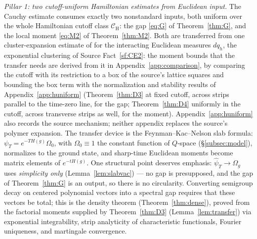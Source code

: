 \documentclass[11pt,a4paper]{article}
\theoremstyle{plain}
\theoremstyle{definition}
\theoremstyle{plain}
\theoremstyle{definition}
\newcommand{\CH}{\mathcal{C}_{\mathrm H}}
\newcommand{\Om}{\Omega}
\begin{document}
\emph{Pillar 1: two cutoff-uniform Hamiltonian estimates from Euclidean input.} The
Cauchy estimate consumes exactly two nonstandard inputs, both uniform over the whole
Hamiltonian cutoff class $\CH$: the gap \eqref{eq:G} of Theorem~\ref{thm:G}, and the
local moment \eqref{eq:M2} of Theorem~\ref{thm:M2}. Both are transferred from one
cluster-expansion estimate of \cite{GJS} for the interacting Euclidean measures
$dq_h$, the exponential clustering of Source Fact~\ref{sf:CE2}: the moment bounds that the
transfer needs are derived from it in Appendix~\ref{app:comparison}, by comparing the
cutoff with its restriction to a box of the source's lattice squares and bounding the
box term with the normalization and stability results of Appendix~\ref{app:huniform}
(Theorem~\ref{thm:D3} at fixed cutoff, across strips parallel to the time-zero line, for
the gap; Theorem~\ref{thm:D4} uniformly in the cutoff, across transverse strips as well,
for the moment).  Appendix~\ref{app:huniform} also records the source mechanism; neither
appendix replaces the source's polymer expansion. The transfer device is the
Feynman--Kac--Nelson slab formula: $\psi_T=e^{-TH(g)}\Om_0$, with $\Om_0\equiv1$ the constant
function of $Q$-space (\S\ref{subsec:model}), normalizes to the ground
state, and sharp-time Euclidean moments become matrix elements of $e^{-tH(g)}$. One
structural point deserves emphasis: $\hat\psi_T\to\Om_g$ uses \emph{simplicity only}
(Lemma~\ref{lem:slabvac}) --- no gap is presupposed, and the gap of
Theorem~\ref{thm:G} is an output, so there is no circularity. Converting semigroup decay
on centered polynomial vectors into a spectral gap requires that these vectors be total;
this is the density theorem (Theorem~\ref{thm:dense}), proved from the factorial moments
supplied by Theorem~\ref{thm:D3} (Lemma~\ref{lem:transfer}) via exponential integrability, strip analyticity of
characteristic functionals, Fourier uniqueness, and martingale convergence.
\end{document}
